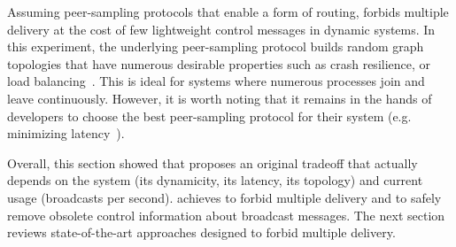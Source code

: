 \noindent Assuming peer-sampling protocols that enable a form of routing,
\RPCBROADCAST forbids multiple delivery at the cost of few lightweight control
messages in dynamic systems. In this experiment, the underlying peer-sampling
protocol builds random graph topologies that have numerous desirable properties
such as crash resilience, or load balancing~\cite{jelasity2007gossip}. This is
ideal for systems where numerous processes join and leave continuously. However,
it is worth noting that it remains in the hands of developers to choose the best
peer-sampling protocol for their system (e.g. minimizing
latency~\cite{dabek2004vivaldi}).


Overall, this section showed that \RPCBROADCAST proposes an original tradeoff
that actually depends on the system (its dynamicity, its latency, its topology)
and current usage (broadcasts per second).  \RPCBROADCAST achieves to forbid
multiple delivery and to safely remove obsolete control information about
broadcast messages. The next section reviews state-of-the-art approaches
designed to forbid multiple delivery.




